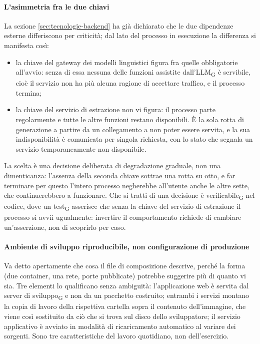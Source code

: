 \documentclass[a4paper, 10pt]{article}
\begin{document}
\paragraph{L'asimmetria fra le due chiavi}
La sezione \ref{sec:tecnologie-backend} ha già dichiarato che le due dipendenze esterne differiscono per criticità; dal lato del processo in esecuzione la differenza si manifesta così:

\begin{itemize}
    \setlength{\itemsep}{2pt}
    \item la chiave del gateway dei modelli linguistici figura fra quelle obbligatorie all'avvio: senza di essa nessuna delle funzioni assistite dall'LLM\textsubscript{G} è servibile, cioè il servizio non ha più alcuna ragione di accettare traffico, e il processo termina;
    \item la chiave del servizio di estrazione non vi figura: il processo parte regolarmente e tutte le altre funzioni restano disponibili. È la sola rotta di generazione a partire da un collegamento a non poter essere servita, e la sua indisponibilità è comunicata per singola richiesta, con lo stato che segnala un servizio temporaneamente non disponibile.
\end{itemize}

\noindent La scelta è una decisione deliberata di degradazione graduale, non una dimenticanza: l'assenza della seconda chiave sottrae una rotta su otto, e far terminare per questo l'intero processo negherebbe all'utente anche le altre sette, che continuerebbero a funzionare. Che si tratti di una decisione è verificabile\textsubscript{G} nel codice, dove un test\textsubscript{G} asserisce che senza la chiave del servizio di estrazione il processo si avvii ugualmente: invertire il comportamento richiede di cambiare un'asserzione, non di scoprirlo per caso.

\paragraph{Ambiente di sviluppo riproducibile, non configurazione di produzione}
Va detto apertamente che cosa il file di composizione descrive, perché la forma (due container, una rete, porte pubblicate) potrebbe suggerire più di quanto vi sia. Tre elementi lo qualificano senza ambiguità: l'applicazione web è servita dal server di sviluppo\textsubscript{G} e non da un pacchetto costruito; entrambi i servizi montano la copia di lavoro della rispettiva cartella sopra il contenuto dell'immagine, che viene così sostituito da ciò che si trova sul disco dello sviluppatore; il servizio applicativo è avviato in modalità di ricaricamento automatico al variare dei sorgenti. Sono tre caratteristiche del lavoro quotidiano, non dell'esercizio.
\end{document}
